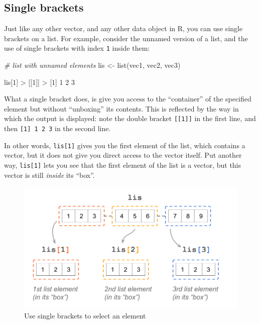\documentclass[
]{book}
\newenvironment{Shaded}{\begin{snugshade}}{\end{snugshade}}
\newcommand{\CommentTok}[1]{\textcolor[rgb]{0.56,0.35,0.01}{\textit{#1}}}
\newcommand{\DecValTok}[1]{\textcolor[rgb]{0.00,0.00,0.81}{#1}}
\newcommand{\FunctionTok}[1]{\textcolor[rgb]{0.00,0.00,0.00}{#1}}
\newcommand{\NormalTok}[1]{#1}
\newcommand{\OtherTok}[1]{\textcolor[rgb]{0.56,0.35,0.01}{#1}}
\newcommand{\SpecialCharTok}[1]{\textcolor[rgb]{0.00,0.00,0.00}{#1}}
\begin{document}
\hypertarget{single-brackets}{%
\subsection{Single brackets}\label{single-brackets}}

Just like any other vector, and any other data object in R, you can use single
brackets on a list. For example, consider the unnamed version of a list, and
the use of single brackets with index \texttt{1} inside them:

\begin{Shaded}
\begin{Highlighting}[]
\CommentTok{\# list with unnamed elements}
\NormalTok{lis }\OtherTok{\textless{}{-}} \FunctionTok{list}\NormalTok{(vec1, vec2, vec3)}

\NormalTok{lis[}\DecValTok{1}\NormalTok{]}
\SpecialCharTok{\textgreater{}}\NormalTok{ [[}\DecValTok{1}\NormalTok{]]}
\SpecialCharTok{\textgreater{}}\NormalTok{ [}\DecValTok{1}\NormalTok{] }\DecValTok{1} \DecValTok{2} \DecValTok{3}
\end{Highlighting}
\end{Shaded}

What a single bracket does, is give you access to the ``container'' of the
specified element but without ``unboxing'' its contents. This is reflected by
the way in which the output is displayed: note the double bracket \texttt{{[}{[}1{]}{]}} in
the first line, and then \texttt{{[}1{]}\ 1\ 2\ 3} in the second line.

In other words, \texttt{lis{[}1{]}} gives you the first element of the list, which
contains a vector, but it does not give you direct access to the vector itself.
Put another way, \texttt{lis{[}1{]}} lets you see that the first element of the list is
a vector, but this vector is still \emph{inside} its ``box''.

\begin{figure}

{\centering \includegraphics[width=0.75\linewidth]{images/objects/obj-list-brackets2} 

}

\caption{Use single brackets to select an element}\label{fig:unnamed-chunk-153}
\end{figure}
\end{document}
